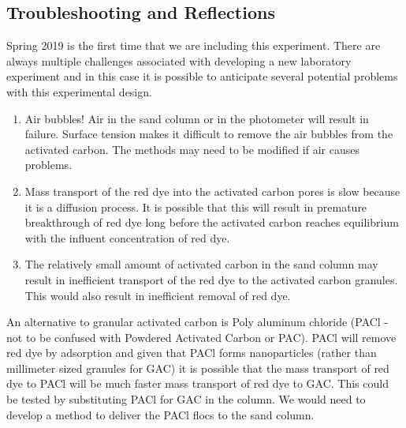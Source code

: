 \documentclass[letterpaper,10pt,english]{sphinxmanual}
\begin{document}
\subsection{Troubleshooting and Reflections}
\label{\detokenize{Adsorption/Adsorption:troubleshooting-and-reflections}}
Spring 2019 is the first time that we are including this experiment. There are always multiple challenges associated with developing a new laboratory experiment and in this case it is possible to anticipate several potential problems with this experimental design.
\begin{enumerate}
\item {} 
Air bubbles! Air in the sand column or in the photometer will result in failure. Surface tension makes it difficult to remove the air bubbles from the activated carbon. The methods may need to be modified if air causes problems.

\item {} 
Mass transport of the red dye into the activated carbon pores is slow because it is a diffusion process. It is possible that this will result in premature breakthrough of red dye long before the activated carbon reaches equilibrium with the influent concentration of red dye.

\item {} 
The relatively small amount of activated carbon in the sand column may result in inefficient transport of the red dye to the activated carbon granules. This would also result in inefficient removal of red dye.

\end{enumerate}

An alternative to granular activated carbon is Poly aluminum chloride (PACl - not to be confused with Powdered Activated Carbon or PAC). PACl will remove red dye by adsorption and given that PACl forms nanoparticles (rather than millimeter sized granules for GAC) it is possible that the mass transport of red dye to PACl will be much faster mass transport of red dye to GAC. This could be tested by substituting PACl for GAC in the column. We would need to develop a method to deliver the PACl flocs to the sand column.
\end{document}
